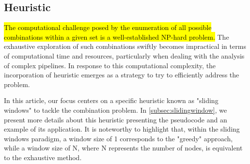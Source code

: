 \subsection{Heuristic}\label{subsec:heuristics}
\hl{The computational challenge posed by the enumeration of all possible combinations within a given set is a well-established NP-hard problem.}
The exhaustive exploration of such combinations swiftly becomes impractical in terms of computational time and resources,
particularly when dealing with the analysis of complex pipelines.
In response to this computational complexity,
the incorporation of heuristic emerges as a strategy to try to efficiently address the problem.

In this article, our focus centers on a specific heuristic known as "sliding windows" to tackle the combination problem.
In \cref{subsec:slidingwindow}, we present more details about this heuristic presenting the pseudocode and an example of its application.
It is noteworthy to highlight that, within the sliding windows paradigm, a window size of 1 corresponds to the "greedy" approach,
while a window size of N, where N represents the number of nodes, is equivalent to the exhaustive method.
